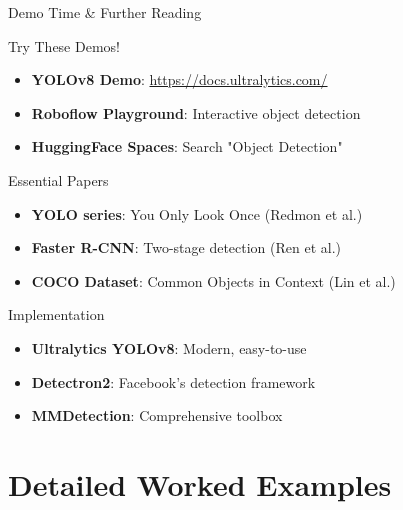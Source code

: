 \documentclass[usenames,dvipsnames]{beamer}
\begin{document}
	\begin{frame}{Demo Time \& Further Reading}
		\begin{examplebox}{Try These Demos!}
		\begin{itemize}
			\item \textbf{YOLOv8 Demo}: \url{https://docs.ultralytics.com/}
			\item \textbf{Roboflow Playground}: Interactive object detection
			\item \textbf{HuggingFace Spaces}: Search "Object Detection"
		\end{itemize}
		\end{examplebox}
		
		\begin{definitionbox}{Essential Papers}
		\begin{itemize}
			\item \textbf{YOLO series}: You Only Look Once (Redmon et al.)
			\item \textbf{Faster R-CNN}: Two-stage detection (Ren et al.)
			\item \textbf{COCO Dataset}: Common Objects in Context (Lin et al.)
		\end{itemize}
		\end{definitionbox}
		
		\begin{codebox}{Implementation}
		\begin{itemize}
			\item \textbf{Ultralytics YOLOv8}: Modern, easy-to-use
			\item \textbf{Detectron2}: Facebook's detection framework
			\item \textbf{MMDetection}: Comprehensive toolbox
		\end{itemize}
		\end{codebox}
	\end{frame}

	\section{Detailed Worked Examples}
	
\end{document}
